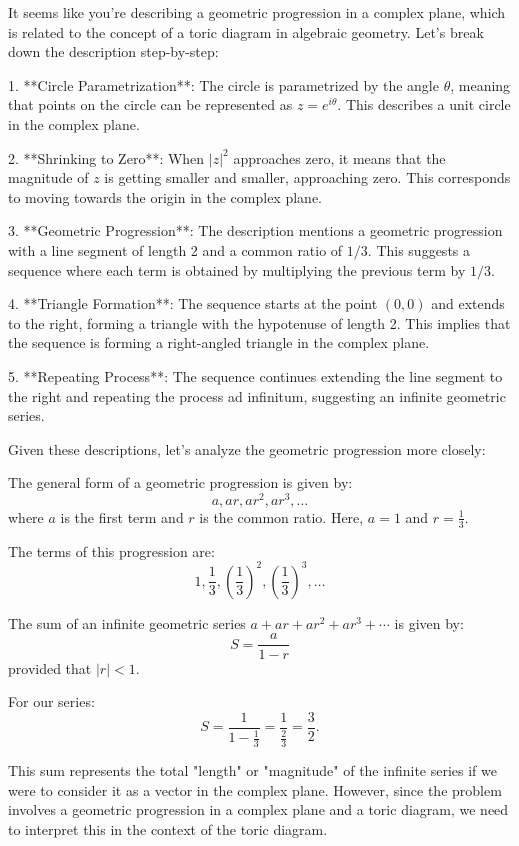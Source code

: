 It seems like you're describing a geometric progression in a complex plane, which is related to the concept of a toric diagram in algebraic geometry. Let's break down the description step-by-step:

1. **Circle Parametrization**: The circle is parametrized by the angle \(\theta\), meaning that points on the circle can be represented as \(z = e^{i\theta}\). This describes a unit circle in the complex plane.

2. **Shrinking to Zero**: When \(|z|^2\) approaches zero, it means that the magnitude of \(z\) is getting smaller and smaller, approaching zero. This corresponds to moving towards the origin in the complex plane.

3. **Geometric Progression**: The description mentions a geometric progression with a line segment of length 2 and a common ratio of \(1/3\). This suggests a sequence where each term is obtained by multiplying the previous term by \(1/3\).

4. **Triangle Formation**: The sequence starts at the point \((0,0)\) and extends to the right, forming a triangle with the hypotenuse of length 2. This implies that the sequence is forming a right-angled triangle in the complex plane.

5. **Repeating Process**: The sequence continues extending the line segment to the right and repeating the process ad infinitum, suggesting an infinite geometric series.

Given these descriptions, let's analyze the geometric progression more closely:

The general form of a geometric progression is given by:
\[a, ar, ar^2, ar^3, \ldots\]
where \(a\) is the first term and \(r\) is the common ratio. Here, \(a = 1\) and \(r = \frac{1}{3}\).

The terms of this progression are:
\[1, \frac{1}{3}, \left(\frac{1}{3}\right)^2, \left(\frac{1}{3}\right)^3, \ldots\]

The sum of an infinite geometric series \(a + ar + ar^2 + ar^3 + \cdots\) is given by:
\[S = \frac{a}{1 - r}\]
provided that \(|r| < 1\).

For our series:
\[S = \frac{1}{1 - \frac{1}{3}} = \frac{1}{\frac{2}{3}} = \frac{3}{2}.\]

This sum represents the total "length" or "magnitude" of the infinite series if we were to consider it as a vector in the complex plane. However, since the problem involves a geometric progression in a complex plane and a toric diagram, we need to interpret this in the context of the toric diagram.

